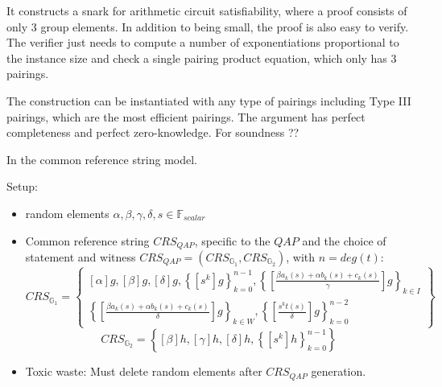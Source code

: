 It constructs a snark  for arithmetic circuit satisfiability, where a proof consists of only 3 group elements. In addition to being small, the proof is also easy to verify. The verifier just needs to compute a number of exponentiations proportional to the instance size and check a single pairing product equation, which only  has  3  pairings.  

The  construction  can  be  instantiated  with  any  type  of  pairings including Type III pairings, which are the most efficient pairings. The argument has perfect completeness and perfect zero-knowledge. For soundness ?? 

In the common reference string model.

Setup: 
\begin{itemize}
\item random elements $\alpha,\beta,\gamma, \delta, s \in \mathbb{F}_{scalar}$ 
\item Common reference string $CRS_{QAP}$, specific to the $QAP$ and the choice of statement and witness $CRS_{QAP}= (CRS_{\mathbb{G}_1},CRS_{\mathbb{G}_2})$, with $n=deg(t)$: 
$$
CRS_{\mathbb{G}_{1}}=\left\{ \begin{array}{c}
[\alpha]g,[\beta]g,[\delta]g,\left\{ [s^{k}]g\right\} _{k=0}^{n-1},\left\{ [\frac{\beta a_{k}(s)+\alpha b_{k}(s)+c_{k}(s)}{\gamma}]g\right\} _{k\in I}\\
\left\{ [\frac{\beta a_{k}(s)+\alpha b_{k}(s)+c_{k}(s)}{\delta}]g\right\} _{k\in W},\left\{ [\frac{s^{k}t(s)}{\delta}]g\right\} _{k=0}^{n-2}
\end{array}\right\} 
$$
$$
CRS_{\mathbb{G}_{2}}=\left\{ [\beta]h ,[\gamma]h,[\delta]h,\left\{[s^k]h\right\} _{k=0}^{n-1}\right\} 
$$
\item Toxic waste: Must delete random elements after $CRS_{QAP}$ generation.
\end{itemize} 


